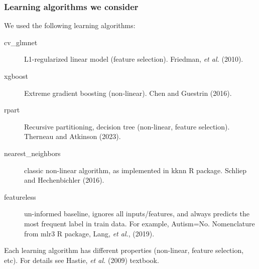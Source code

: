 \documentclass{beamer}
\begin{document}
\begin{frame}
  \frametitle{Learning algorithms we consider}
  We used the following learning algorithms:
\begin{description}
\item[cv\_glmnet] L1-regularized linear model (feature
  selection). Friedman, \emph{et al.} (2010).
\item[xgboost] Extreme gradient boosting (non-linear). Chen and Guestrin (2016). 
\item[rpart] Recursive partitioning, decision tree (non-linear, feature selection). Therneau and Atkinson (2023).
\item[nearest\_neighbors] classic non-linear algorithm, as implemented
  in kknn R package. Schliep and Hechenbichler (2016).
\item[featureless] un-informed baseline, ignores all inputs/features,
  and always predicts the most frequent label in train data. For
  example, Autism=No. Nomenclature from mlr3 R package,
  Lang, \emph{et al.}, (2019).
\end{description}
Each learning algorithm has different properties (non-linear, feature
selection, etc). For details see Hastie, {\it et al.} (2009) textbook.
\end{frame}
\end{document}
